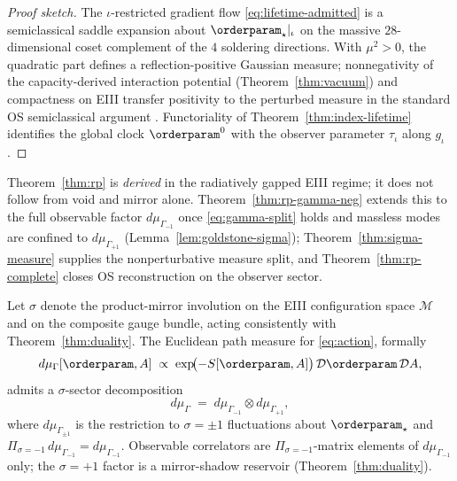 \begin{proof}[Proof sketch]
The $\iota$-restricted gradient flow \eqref{eq:lifetime-admitted} is a
semiclassical saddle expansion about $\orderparam_\star|_\iota$ on the massive
$28$-dimensional coset complement of the $4$ soldering directions. With
$\mu^2>0$, the quadratic part defines a reflection-positive Gaussian measure;
nonnegativity of the capacity-derived interaction potential
(Theorem~\ref{thm:vacuum}) and compactness on EIII transfer positivity to the
perturbed measure in the standard OS semiclassical argument
\cite{GlimmJaffe1987,OsterwalderSchrader1973}. Functoriality of
Theorem~\ref{thm:index-lifetime} identifies the global clock
$\orderparam^0$ with the observer parameter $\tau_\iota$ along $g_\iota$.
\end{proof}

\begin{remark}
Theorem~\ref{thm:rp} is \emph{derived} in the radiatively gapped EIII regime;
it does not follow from void and mirror alone. Theorem~\ref{thm:rp-gamma-neg}
extends this to the full observable factor $d\mu_{\Gamma_{-1}}$ once
\eqref{eq:gamma-split} holds and massless modes are confined to
$d\mu_{\Gamma_{+1}}$ (Lemma~\ref{lem:goldstone-sigma}); Theorem~\ref{thm:sigma-measure}
supplies the nonperturbative measure split, and Theorem~\ref{thm:rp-complete}
closes OS reconstruction on the observer sector.
\end{remark}

\begin{theorem}
\label{thm:sigma-measure}
Let $\sigma$ denote the product-mirror involution on the EIII configuration
space $\mathcal{M}$ and on the composite gauge bundle, acting consistently with
Theorem~\ref{thm:duality}. The Euclidean path measure for \eqref{eq:action},
formally
\begin{equation}\label{eq:gamma-full}
  d\mu_\Gamma[\orderparam,A]
  \;\propto\;
  \exp\!\bigl(-S[\orderparam,A]\bigr)\,\mathcal{D}\orderparam\,\mathcal{D}A,
\end{equation}
admits a $\sigma$-sector decomposition
\begin{equation}\label{eq:gamma-split}
  d\mu_\Gamma
  \;=\;
  d\mu_{\Gamma_{-1}}\otimes d\mu_{\Gamma_{+1}},
\end{equation}
where $d\mu_{\Gamma_{\pm1}}$ is the restriction to $\sigma=\pm1$
fluctuations about $\orderparam_\star$ and
$\Pi_{\sigma=-1}\,d\mu_{\Gamma_{-1}}=d\mu_{\Gamma_{-1}}$.
Observable correlators are $\Pi_{\sigma=-1}$-matrix elements of
$d\mu_{\Gamma_{-1}}$ only; the $\sigma=+1$ factor is a mirror-shadow
reservoir (Theorem~\ref{thm:duality}).
\end{theorem}

